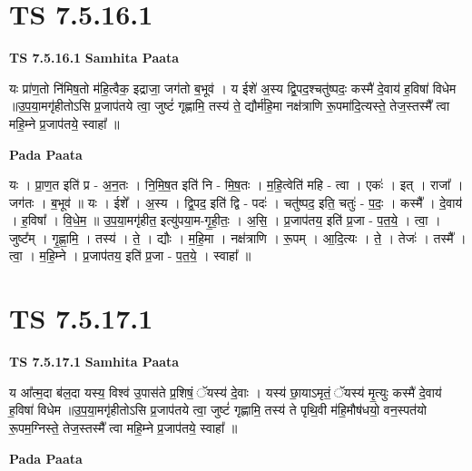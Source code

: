 \documentclass[17pt]{extarticle}
\begin{document}

\section{ TS 7.5.16.1 }

\textbf{TS 7.5.16.1 } \newline
\textbf{Samhita Paata} \newline

यः प्रा॑ण॒तो नि॑मिष॒तो म॑हि॒त्वैक॒ इद्राजा॒ जग॑तो ब॒भूव॑ । य ईशे॑ अ॒स्य द्वि॒पद॒श्चतु॑ष्पदः॒ कस्मै॑ दे॒वाय॑ ह॒विषा॑ विधेम ॥उ॒प॒या॒मगृ॑हीतोऽसि प्र॒जाप॑तये त्वा॒ जुष्टं॑ गृह्णामि॒ तस्य॑ ते॒ द्यौर्म॑हि॒मा नक्ष॑त्राणि रू॒पमा॑दि॒त्यस्ते॒ तेज॒स्तस्मै᳚ त्वा महि॒म्ने प्र॒जाप॑तये॒ स्वाहा᳚ ॥ \newline

\textbf{Pada Paata} \newline

यः । प्रा॒ण॒त इति॑ प्र - अ॒न॒तः । नि॒मि॒ष॒त इति॑ नि - मि॒ष॒तः । म॒हि॒त्वेति॑ महि - त्वा । एकः॑ । इत् । राजा᳚ । जग॑तः । ब॒भूव॑ ॥ यः । ईशे᳚ । अ॒स्य । द्वि॒पद॒ इति॑ द्वि - पदः॑ । चतु॑ष्पद॒ इति॒ चतुः॑ - प॒दः॒ । कस्मै᳚ । दे॒वाय॑ । ह॒विषा᳚ । वि॒धे॒म॒ ॥ उ॒प॒या॒मगृ॑हीत॒ इत्यु॑पया॒म-गृ॒ही॒तः॒ । अ॒सि॒ । प्र॒जाप॑तय॒ इति॑ प्र॒जा - प॒त॒ये॒ । त्वा॒ । जुष्ट᳚म् । गृ॒ह्णा॒मि॒ । तस्य॑ । ते॒ । द्यौः । म॒हि॒मा । नक्ष॑त्राणि । रू॒पम् । आ॒दि॒त्यः । ते॒ । तेजः॑ । तस्मै᳚ । त्वा॒ । म॒हि॒म्ने । प्र॒जाप॑तय॒ इति॑ प्र॒जा - प॒त॒ये॒ । स्वाहा᳚ ॥  \newline





\section{ TS 7.5.17.1 }

\textbf{TS 7.5.17.1 } \newline
\textbf{Samhita Paata} \newline

य आ᳚त्म॒दा ब॑ल॒दा यस्य॒ विश्व॑ उ॒पास॑ते प्र॒शिषं॒ ॅयस्य॑ दे॒वाः । यस्य॑ छा॒याऽमृतं॒ ॅयस्य॑ मृ॒त्युः कस्मै॑ दे॒वाय॑ ह॒विषा॑ विधेम ॥उ॒प॒या॒मगृ॑हीतोऽसि प्र॒जाप॑तये त्वा॒ जुष्टं॑ गृह्णामि॒ तस्य॑ ते पृथि॒वी म॑हि॒मौष॑धयो॒ वन॒स्पत॑यो रू॒पम॒ग्निस्ते॒ तेज॒स्तस्मै᳚ त्वा महि॒म्ने प्र॒जाप॑तये॒ स्वाहा᳚ ॥ \newline

\textbf{Pada Paata} \newline
\end{document}
